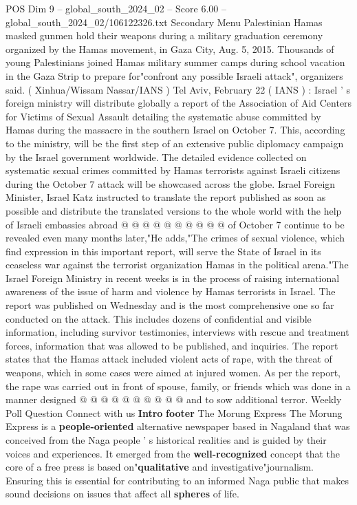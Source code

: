 \begin{textsample}{POS Dim 9 – global\_south\_2024\_02 – Score 6.00 – global\_south\_2024\_02/106122326.txt}  \label{ex:f9_pos_091}
Secondary Menu Palestinian Hamas masked gunmen hold their weapons during a military graduation ceremony organized by the Hamas movement, in Gaza City, Aug. 5, 2015.
Thousands of young Palestinians joined Hamas military summer camps during school vacation in the Gaza Strip to prepare for"confront any possible Israeli attack", organizers said. ( Xinhua/Wissam Nassar/IANS ) Tel Aviv, February 22 ( IANS ) : Israel ' s foreign ministry will distribute globally a report of the Association of Aid Centers for Victims of Sexual Assault detailing the systematic abuse committed by Hamas during the massacre in the southern Israel on October 7.
This, according to the ministry, will be the first step of an extensive public diplomacy campaign by the Israel government worldwide.
The detailed evidence collected on systematic sexual crimes committed by Hamas terrorists against Israeli citizens during the October 7 attack will be showcased across the globe.
Israel Foreign Minister, Israel Katz instructed to translate the report published as soon as possible and distribute the translated versions to the whole world with the help of Israeli embassies abroad @ @ @ @ @ @ @ @ @ @ of October 7 continue to be revealed even many months later,"He adds,"The crimes of sexual violence, which find expression in this important report, will serve the State of Israel in its ceaseless war against the terrorist organization Hamas in the political arena."The Israel Foreign Ministry in recent weeks is in the process of raising international awareness of the issue of harm and violence by Hamas terrorists in Israel.
The report was published on Wednesday and is the most comprehensive one so far conducted on the attack.
This includes dozens of confidential and visible information, including survivor testimonies, interviews with rescue and treatment forces, information that was allowed to be published, and inquiries.
The report states that the Hamas attack included violent acts of rape, with the threat of weapons, which in some cases were aimed at injured women.
As per the report, the rape was carried out in front of spouse, family, or friends which was done in a manner designed @ @ @ @ @ @ @ @ @ @ and to sow additional terror.
Weekly Poll Question Connect with us \textbf{Intro} \textbf{footer} The Morung Express The Morung Express is a \textbf{people-oriented} alternative newspaper based in Nagaland that was conceived from the Naga people ' s historical realities and is guided by their voices and experiences.
It emerged from the \textbf{well-recognized} concept that the core of a free press is based on"\textbf{qualitative} and investigative"journalism.
Ensuring this is essential for contributing to an informed Naga public that makes sound decisions on issues that affect all \textbf{spheres} of life.

\end{textsample}
